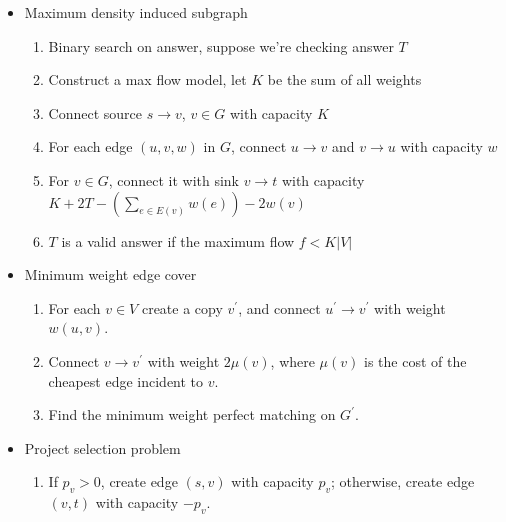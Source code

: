 \begin{itemize}
    \item Maximum density induced subgraph
    \vspace{-1em}
    \begin{enumerate}
        \itemsep-0.3em
        \item Binary search on answer, suppose we're checking answer $T$
        \item Construct a max flow model, let $K$ be the sum of all weights
        \item Connect source $s \rightarrow v$, $v \in G$ with capacity $K$
        \item For each edge $(u, v, w)$ in $G$, connect $u \rightarrow v$ and $v \rightarrow u$ with capacity $w$
        \item For $v \in G$, connect it with sink $v \rightarrow t$ with capacity $K + 2T - (\sum_{e \in E(v)}{w(e)}) - 2w(v)$
        \item $T$ is a valid answer if the maximum flow $f < K \lvert V \rvert$
    \end{enumerate}
    \item Minimum weight edge cover
    \vspace{-1em}
    \begin{enumerate}
        \itemsep-0.3em
      \item For each $v \in V$ create a copy $v^\prime$, and connect $u^\prime \to v^\prime$ with weight $w(u, v)$.
      \item Connect $v \to v^\prime$ with weight $2\mu(v)$, where $\mu(v)$ is the cost of the cheapest edge incident to $v$.
      \item Find the minimum weight perfect matching on $G^\prime$.
    \end{enumerate}
    \item Project selection problem
    \vspace{-1em}
    \begin{enumerate}
      \itemsep-0.3em
      \item If $p_v > 0$, create edge $(s, v)$ with capacity $p_v$; otherwise, create edge $(v, t)$ with capacity $-p_v$.

\end{enumerate}
\end{itemize}
